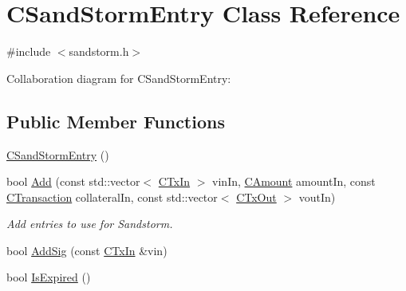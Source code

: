 \hypertarget{class_c_sand_storm_entry}{}\section{C\+Sand\+Storm\+Entry Class Reference}
\label{class_c_sand_storm_entry}


{\ttfamily \#include $<$sandstorm.\+h$>$}



Collaboration diagram for C\+Sand\+Storm\+Entry\+:
\subsection*{Public Member Functions}
\begin{DoxyCompactItemize}
\item 
\hyperlink{class_c_sand_storm_entry_a15adaf4f0f93427dcadce05e2f7e3174}{C\+Sand\+Storm\+Entry} ()
\item 
bool \hyperlink{class_c_sand_storm_entry_aa1497e8d6693f47968af94ea946ea9e6}{Add} (const std\+::vector$<$ \hyperlink{class_c_tx_in}{C\+Tx\+In} $>$ vin\+In, \hyperlink{amount_8h_a4eaf3a5239714d8c45b851527f7cb564}{C\+Amount} amount\+In, const \hyperlink{class_c_transaction}{C\+Transaction} collateral\+In, const std\+::vector$<$ \hyperlink{class_c_tx_out}{C\+Tx\+Out} $>$ vout\+In)
\begin{DoxyCompactList}\small\item\em Add entries to use for Sandstorm. \end{DoxyCompactList}\item 
bool \hyperlink{class_c_sand_storm_entry_afa10b9e19a0a0916b9d3153e2adce11b}{Add\+Sig} (const \hyperlink{class_c_tx_in}{C\+Tx\+In} \&vin)
\item 
bool \hyperlink{class_c_sand_storm_entry_a903de6ae89a6755fa2e9112e52c6d161}{Is\+Expired} ()
\end{DoxyCompactItemize}
